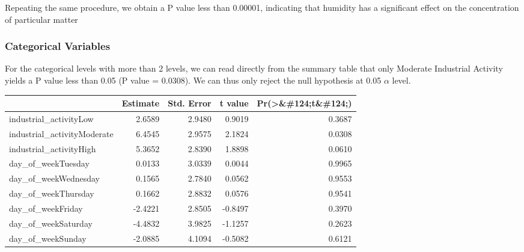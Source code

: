 \documentclass[12pt,halfline,a4paper,]{ouparticle}
\newenvironment{Shaded}{\begin{snugshade}}{\end{snugshade}}
\newcommand{\AttributeTok}[1]{\textcolor[rgb]{0.13,0.29,0.53}{#1}}
\newcommand{\DecValTok}[1]{\textcolor[rgb]{0.00,0.00,0.81}{#1}}
\newcommand{\FunctionTok}[1]{\textcolor[rgb]{0.13,0.29,0.53}{\textbf{#1}}}
\newcommand{\NormalTok}[1]{#1}
\newcommand{\OtherTok}[1]{\textcolor[rgb]{0.56,0.35,0.01}{#1}}
\newcommand{\SpecialCharTok}[1]{\textcolor[rgb]{0.81,0.36,0.00}{\textbf{#1}}}
\begin{document}
Repeating the same procedure, we obtain a P value less than 0.00001,
indicating that humidity has a significant effect on the concentration
of particular matter

\subsubsection{Categorical Variables}\label{categorical-variables}

For the categorical levels with more than 2 levels, we can read directly
from the summary table that only Moderate Industrial Activity yields a P
value less than 0.05 (P value = 0.0308). We can thus only reject the
null hypothesis at 0.05 \(\alpha\) level.

\begin{Shaded}
\end{Shaded}

\begingroup\fontsize{12}{14}\selectfont

\begin{longtable}[t]{lrrrr}
\toprule
 & Estimate & Std. Error & t value & Pr(>\&\#124;t\&\#124;)\\
\midrule
industrial\_activityLow & 2.6589 & 2.9480 & 0.9019 & 0.3687\\
industrial\_activityModerate & 6.4545 & 2.9575 & 2.1824 & 0.0308\\
industrial\_activityHigh & 5.3652 & 2.8390 & 1.8898 & 0.0610\\
day\_of\_weekTuesday & 0.0133 & 3.0339 & 0.0044 & 0.9965\\
day\_of\_weekWednesday & 0.1565 & 2.7840 & 0.0562 & 0.9553\\
\addlinespace
day\_of\_weekThursday & 0.1662 & 2.8832 & 0.0576 & 0.9541\\
day\_of\_weekFriday & -2.4221 & 2.8505 & -0.8497 & 0.3970\\
day\_of\_weekSaturday & -4.4832 & 3.9825 & -1.1257 & 0.2623\\
day\_of\_weekSunday & -2.0885 & 4.1094 & -0.5082 & 0.6121\\
\bottomrule
\end{longtable}
\endgroup{}
\end{document}
